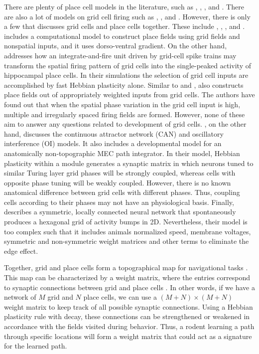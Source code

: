 \documentclass[11pt, letterpaper, onecolumn]{article}
\begin{document}
There are plenty of place cell models in the literature, such as \cite{Tsodyks:Population96}, \cite{Arleo:Spatial00}, \cite{Lengyel:Dynamically03}, \cite{Lever:Long02} and \cite{Bostock:Experience91}. There are also a lot of models on grid cell firing such as \cite{Burgess:oscillatory07}, \cite{Giocomo:Temporal07}, \cite{Zilli:Coupled10} \cite{Hasselmo:Grid07} and \cite{Hasselmo:Grid08}. However, there is only a few that discusses grid cells and place cells together. These include \cite{Lyttle:Spatial13}, \cite{Solstad:From06}, \cite{McNaughton:Path06}, \cite{Fuhs:spin06} and \cite{Savelli:Hebbian10}. \cite{Lyttle:Spatial13} includes a computational model to construct place fields using grid fields and nonspatial inputs, and it uses dorso-ventral gradient. On the other hand,\cite{Savelli:Hebbian10} addresses how an integrate-and-fire unit driven by grid-cell spike trains may transform the spatial firing pattern of grid cells into the single-peaked activity of hippocampal place cells. In their simulations the selection of grid cell inputs are accomplished by fast Hebbian plasticity alone. Similar to \cite{Lyttle:Spatial13} and \cite{Savelli:Hebbian10}, \cite{Solstad:From06} also constructs place fields out of appropriately weighted inputs from grid cells. The authors have found out that when the spatial phase variation in the grid cell input is high, multiple and irregularly spaced firing fields are formed. However, none of these aim to answer any questions related to development of grid cells. \cite{McNaughton:Path06}, on the other hand, discusses the continuous attractor network (CAN) and oscillatory interference (OI) models. It also includes a developmental model for an anatomically non-topographic MEC path integrator. In their model, Hebbian plasticity within a module generates a synaptic matrix in which neurons tuned to similar Turing layer grid phases will be strongly coupled, whereas cells with opposite phase tuning will be weakly coupled. However, there is no known anatomical difference between grid cells with different phases. Thus, coupling cells according to their phases may not have an physiological basis. Finally, \cite{Fuhs:spin06} describes a symmetric, locally connected neural network that spontaneously produces a hexagonal grid of activity bumps in 2D. Nevertheless, their model is too complex such that it includes animals normalized speed, membrane voltages, symmetric and non-symmetric weight matrices and other terms to eliminate the edge effect.

Together, grid and place cells form a topographical map for navigational tasks \cite{Moser:Place08}. This map can be characterized by a weight matrix, where the entries correspond to synaptic connections between grid and place cells \cite{Burak:Accurate09}. In other words, if we have a network of $ M $ grid and $ N $ place cells, we can use a $ (M+N)\times(M+N) $ weight matrix to keep track of all possible synaptic connections. Using a Hebbian plasticity rule with decay, these connections can be strengthened or weakened in accordance with the fields visited during behavior. Thus, a rodent learning a path through specific locations will form a weight matrix that could act as a signature for the learned path.
\end{document}
